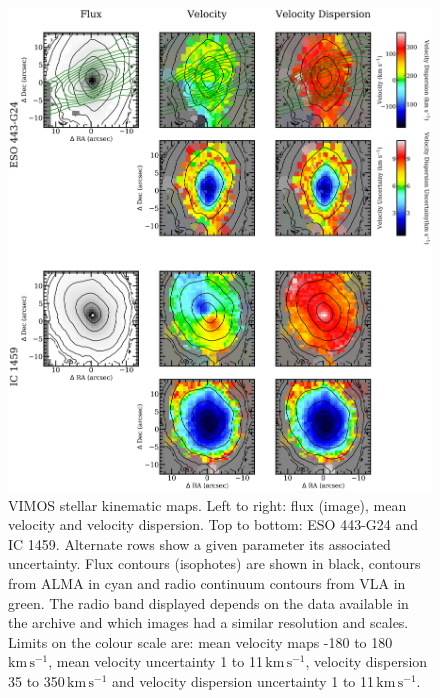 		\begin{figure}
			\centering
			\includegraphics[height=0.62\textheight]{chapter4/vimos/kin1.png}
			\caption[VIMOS stellar kinematic maps]{VIMOS stellar kinematic maps. Left to right: flux (image), mean velocity and velocity dispersion. Top to bottom: ESO 443-G24 and IC 1459. Alternate rows show a given parameter its associated uncertainty. Flux contours (isophotes) are shown in black,  contours from ALMA in cyan and radio continuum contours from VLA in green. The radio band displayed depends on the data available in the archive and which images had a similar resolution and scales. Limits on the colour scale are: mean velocity maps -180 to 180\,$\mathrm{km \, s^{-1}}$, mean velocity uncertainty 1 to 11\,$\mathrm{km \, s^{-1}}$, velocity dispersion 35 to 350\,$\mathrm{km \, s^{-1}}$ and velocity dispersion uncertainty 1 to 11\,$\mathrm{km \, s^{-1}}$.} 
			\label{fig:VIMOS_stellar}
		\end{figure}
